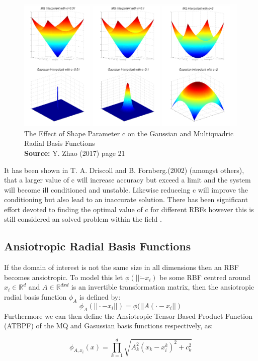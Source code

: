 \documentclass[a4paper]{amsart}
\newcommand*{\captionsource}[2]{%
  \caption[{#1}]{%
    #1%
    \\\hspace{\linewidth}%
    \textbf{Source:} #2%
  }%
}
\begin{document}
\begin{figure}[h]
\centering
\includegraphics[scale=0.5]{RBFShapeParameters.png}
\captionsource{The Effect of Shape Parameter c on the Gaussian and Multiquadric Radial Basis Functions}{ Y. Zhao (2017) \cite{mski0} page 21}
\label {fig:shape}
\end{figure}

It has been shown in T. A. Driscoll and B. Fornberg.(2002) \cite{rbf4} (amongst others), that a larger value of c will increase accuracy but exceed a limit and the system will become ill conditioned and unstable. Likewise reduceing c will improve the conditioning but also lead to an inaccurate solution. There has been significant effort devoted to finding the optimal value of c for different RBFs however this is still considered an solved problem within the field \cite{mski0}.

\subsection {Ansiotropic Radial Basis Functions}

If the domain of interest is not the same size in all dimensions then an RBF becomes ansiotropic. To model this let $\phi(||\dot -x_{i})$ be some RBF centred around $x_{i} \in \mathbb{R}^{d}$ and $A \in \mathbb{R}^{d x d}$ is an invertible transformation matrix, then the ansiotropic radial basis function $\phi_{A}$ is defined by:
\begin{equation}
\phi_{A}(||\cdot-x_{i}||)=\phi(||A(\cdot-x_{i}||)
\end{equation}
Furthermore we can then define the Ansiotropic Tensor Based Product Function (ATBPF) of the MQ and Gasussian basis functions respectively, as:

\begin{equation}
\phi_{A,x_{i}}(x)= \prod^{d}_{k=1}\sqrt{A^{2}_{k}(x_{k}-x^{k}_{i})^{2}+c^{2}_k}
\end{equation}
\end{document}
